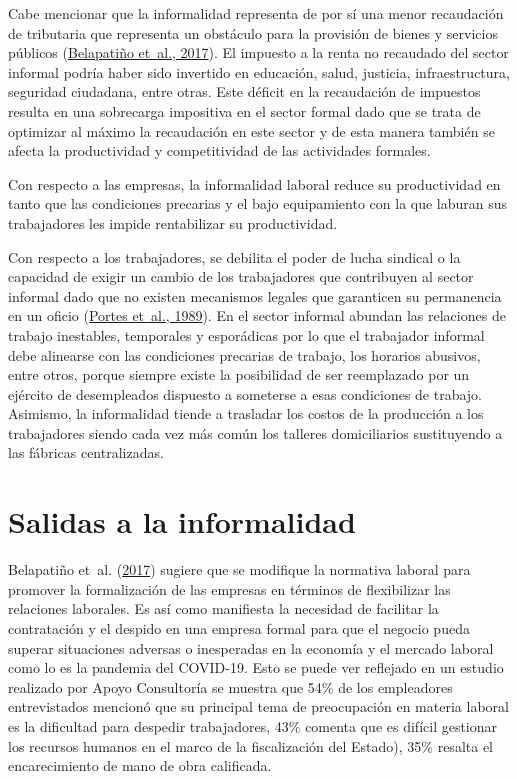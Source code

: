 \documentclass[
  letterpaper,
  12pt,
  oneside,
  spanish,
  doublespacing,
  headsepline,
  parskip]{MastersDoctoralThesis}
\begin{document}
Cabe mencionar que la informalidad representa de por sí una menor
recaudación de tributaria que representa un obstáculo para la provisión
de bienes y servicios públicos
(\protect\hyperlink{ref-belapatiuxf1o2017}{Belapatiño et~al., 2017}). El
impuesto a la renta no recaudado del sector informal podría haber sido
invertido en educación, salud, justicia, infraestructura, seguridad
ciudadana, entre otras. Este déficit en la recaudación de impuestos
resulta en una sobrecarga impositiva en el sector formal dado que se
trata de optimizar al máximo la recaudación en este sector y de esta
manera también se afecta la productividad y competitividad de las
actividades formales.

Con respecto a las empresas, la informalidad laboral reduce su
productividad en tanto que las condiciones precarias y el bajo
equipamiento con la que laburan sus trabajadores les impide rentabilizar
su productividad.

Con respecto a los trabajadores, se debilita el poder de lucha sindical
o la capacidad de exigir un cambio de los trabajadores que contribuyen
al sector informal dado que no existen mecanismos legales que garanticen
su permanencia en un oficio (\protect\hyperlink{ref-theinfo1989}{Portes
et~al., 1989}). En el sector informal abundan las relaciones de trabajo
inestables, temporales y esporádicas por lo que el trabajador informal
debe alinearse con las condiciones precarias de trabajo, los horarios
abusivos, entre otros, porque siempre existe la posibilidad de ser
reemplazado por un ejército de desempleados dispuesto a someterse a esas
condiciones de trabajo. Asimismo, la informalidad tiende a trasladar los
costos de la producción a los trabajadores siendo cada vez más común los
talleres domiciliarios sustituyendo a las fábricas centralizadas.

\hypertarget{salidas-a-la-informalidad}{%
\section{Salidas a la informalidad}\label{salidas-a-la-informalidad}}

Belapatiño et~al. (\protect\hyperlink{ref-belapatiuxf1o2017}{2017})
sugiere que se modifique la normativa laboral para promover la
formalización de las empresas en términos de flexibilizar las relaciones
laborales. Es así como manifiesta la necesidad de facilitar la
contratación y el despido en una empresa formal para que el negocio
pueda superar situaciones adversas o inesperadas en la economía y el
mercado laboral como lo es la pandemia del COVID-19. Esto se puede ver
reflejado en un estudio realizado por Apoyo Consultoría se muestra que
54\% de los empleadores entrevistados mencionó que su principal tema de
preocupación en materia laboral es la dificultad para despedir
trabajadores, 43\% comenta que es difícil gestionar los recursos humanos
en el marco de la fiscalización del Estado), 35\% resalta el
encarecimiento de mano de obra calificada.
\end{document}
